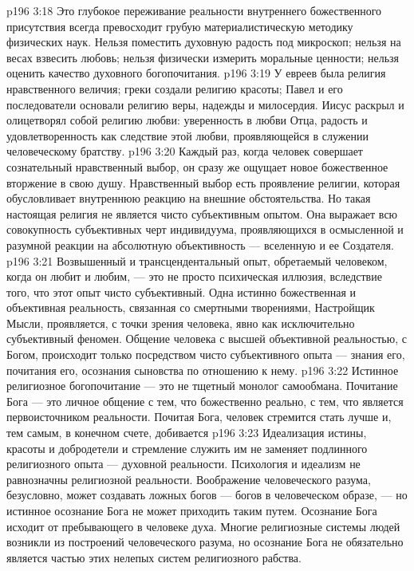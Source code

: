 \vs p196 3:18 Это глубокое переживание реальности внутреннего божественного присутствия всегда превосходит грубую материалистическую методику физических наук. Нельзя поместить духовную радость под микроскоп; нельзя на весах взвесить любовь; нельзя физически измерить моральные ценности; нельзя оценить качество духовного богопочитания.
\vs p196 3:19 У евреев была религия нравственного величия; греки создали религию красоты; Павел и его последователи основали религию веры, надежды и милосердия. Иисус раскрыл и олицетворял собой религию любви: уверенность в любви Отца, радость и удовлетворенность как следствие этой любви, проявляющейся в служении человеческому братству.
\vs p196 3:20 Каждый раз, когда человек совершает сознательный нравственный выбор, он сразу же ощущает новое божественное вторжение в свою душу. Нравственный выбор есть проявление религии, которая обусловливает внутреннюю реакцию на внешние обстоятельства. Но такая настоящая религия не является чисто субъективным опытом. Она выражает всю совокупность субъективных черт индивидуума, проявляющихся в осмысленной и разумной реакции на абсолютную объективность --- вселенную и ее Создателя.
\vs p196 3:21 Возвышенный и трансцендентальный опыт, обретаемый человеком, когда он любит и любим, --- это не просто психическая иллюзия, вследствие того, что этот опыт чисто субъективный. Одна истинно божественная и объективная реальность, связанная со смертными творениями, Настройщик Мысли, проявляется, с точки зрения человека, явно как исключительно субъективный феномен. Общение человека с высшей объективной реальностью, с Богом, происходит только посредством чисто субъективного опыта --- знания его, почитания его, осознания сыновства по отношению к нему.
\vs p196 3:22 Истинное религиозное богопочитание --- это не тщетный монолог самообмана. Почитание Бога --- это личное общение с тем, что божественно реально, с тем, что является первоисточником реальности. Почитая Бога, человек стремится стать лучше и, тем самым, в конечном счете, добивается 
\vs p196 3:23 Идеализация истины, красоты и добродетели и стремление служить им не заменяет подлинного религиозного опыта --- духовной реальности. Психология и идеализм не равнозначны религиозной реальности. Воображение человеческого разума, безусловно, может создавать ложных богов --- богов в человеческом образе, --- но истинное осознание Бога не может приходить таким путем. Осознание Бога исходит от пребывающего в человеке духа. Многие религиозные системы людей возникли из построений человеческого разума, но осознание Бога не обязательно является частью этих нелепых систем религиозного рабства.
